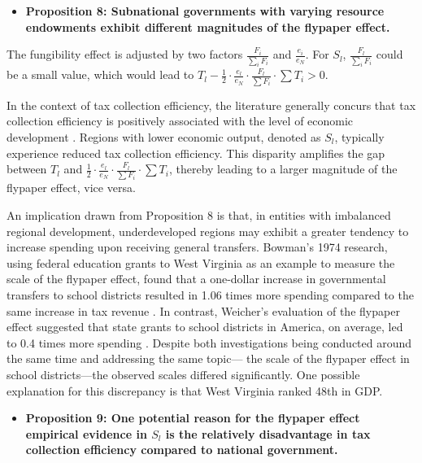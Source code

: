 \begin {itemize}
\item \textbf{Proposition 8: Subnational governments with varying resource endowments exhibit different magnitudes of the flypaper effect.}
\end{itemize}

The fungibility effect is adjusted by two factors $\frac{F_i}{\sum_i F_i}$ and $\frac{e_i}{e_N}$. For $S_l$, $\frac{F_l}{\sum_i F_i}$ could be a small value, which would lead to $T_l-\frac{1}{2}\cdot \frac{e_l}{e_N}\cdot \frac{F_l}{\sum F_i} \cdot \sum T_i>0$.

In the context of tax collection efficiency, the literature generally concurs that tax collection efficiency is positively associated with the level of economic development \parencite{arvate2008efficiency,mattos2011flypaper}. Regions with lower economic output, denoted as $S_l$, typically experience reduced tax collection efficiency. This disparity amplifies the gap between $T_l$ and $\frac{1}{2}\cdot \frac{e_l}{e_N}\cdot \frac{F_l}{\sum F_i} \cdot \sum T_i$, thereby leading to a larger magnitude of the flypaper effect, vice versa.%

An implication drawn from Proposition 8 is that, in entities with imbalanced regional development, underdeveloped regions may exhibit a greater tendency to increase spending upon receiving general transfers. Bowman's 1974 research, using federal education grants to West Virginia as an example to measure the scale of the flypaper effect, found that a one-dollar increase in governmental transfers to school districts resulted in 1.06 times more spending compared to the same increase in tax revenue \parencite{bowman1974tax}. In contrast, Weicher's evaluation of the flypaper effect suggested that state grants to school districts in America, on average, led to 0.4 times more spending \parencite{weicher1972aid}. Despite both investigations being conducted around the same time and addressing the same topic— the scale of the flypaper effect in school districts—the observed scales differed significantly. One possible explanation for this discrepancy is that West Virginia ranked 48th in GDP.%

\begin{itemize}
    \item \textbf{Proposition 9: One potential reason for the flypaper effect empirical evidence in $S_l$ is the relatively disadvantage in tax collection efficiency compared to national government.}
\end{itemize}

